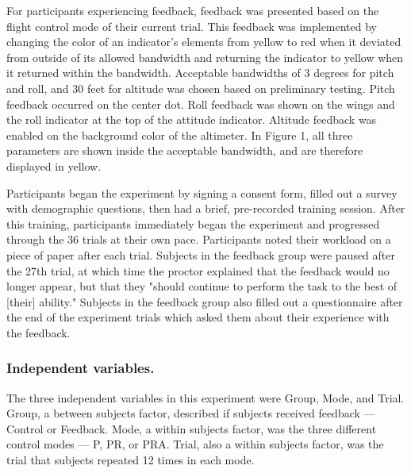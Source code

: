 For participants experiencing feedback, feedback was presented based on the flight control mode of their current trial.
This feedback was implemented by changing the color of an indicator's elements from yellow to red when it deviated from outside of its allowed bandwidth and returning the indicator to yellow when it returned within the bandwidth.
Acceptable bandwidths of 3 degrees for pitch and roll, and 30 feet for altitude was chosen based on preliminary testing.
Pitch feedback occurred on the center dot.
Roll feedback was shown on the wings and the roll indicator at the top of the attitude indicator.
Altitude feedback was enabled on the background color of the altimeter.
In Figure 1, all three parameters are shown inside the acceptable bandwidth, and are therefore displayed in yellow.

Participants began the experiment by signing a consent form, filled out a survey with demographic questions, then had a brief, pre-recorded training session.
After this training, participants immediately began the experiment and progressed through the 36 trials at their own pace.
Participants noted their workload on a piece of paper after each trial.
Subjects in the feedback group were paused after the 27th trial, at which time the proctor explained that the feedback would no longer appear, but that they "should continue to perform the task to the best of [their] ability." Subjects in the feedback group also filled out a questionnaire after the end of the experiment trials which asked them about their experience with the feedback.

\subsubsection{Independent variables.}
The three independent variables in this experiment were Group, Mode, and Trial.
Group, a between subjects factor, described if subjects received feedback — Control or Feedback.
Mode, a within subjects factor, was the three different control modes — P, PR, or PRA.
Trial, also a within subjects factor, was the trial that subjects repeated 12 times in each mode.

